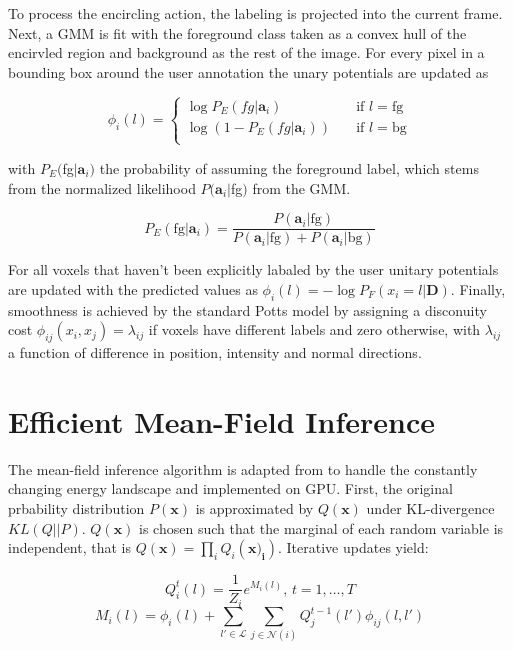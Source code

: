 \documentclass{llncs}
\begin{document}
  To process the encircling action, the labeling is projected into the current frame. Next, a GMM is fit with the foreground class taken as a convex hull of the encirvled region and background as the rest of the image. For every pixel in a bounding box around the user annotation the unary potentials are updated as 

  \begin{equation}
  \phi_i(l) =
    \begin{cases}
      \log P_E(fg|\mathbf{a}_i)       & \quad \text{if } l = \text{fg}\\
      \log (1 - P_E(fg|\mathbf{a}_i))  & \quad \text{if } l = \text{bg}\\
    \end{cases}
  \end{equation}

  with $P_E($fg$|\mathbf{a}_i)$ the probability of assuming the foreground label, which stems from the normalized likelihood $P(\mathbf{a}_i|$fg$)$ from the GMM.

  \begin{equation}
    P_E(\text{fg}|\mathbf{a}_i) = \frac{P(\mathbf{a}_i|\text{fg}) }{P(\mathbf{a}_i|\text{fg}) + P(\mathbf{a}_i|\text{bg})}
  \end{equation}

  For all voxels that haven't been explicitly labaled by the user unitary potentials are updated with the predicted values as $\phi_i(l) = -\log P_F(x_i = l | \mathbf{D})$. Finally, smoothness is achieved by the standard Potts model by assigning a disconuity cost $\phi_{ij}(x_i, x_j) = \lambda_{ij}$ if voxels have different labels and zero otherwise, with $\lambda_{ij}$ a function of difference in position, intensity and normal directions.

\section{Efficient Mean-Field Inference}

The mean-field inference algorithm is adapted from \cite{inference} to handle the constantly changing energy landscape and implemented on GPU. First, the original prbability distribution $P(\mathbf{x})$ is approximated by $Q(\mathbf{x})$ under KL-divergence $KL(Q||P)$.  $Q(\mathbf{x})$ is chosen such that the marginal of each random variable is independent, that is $Q(\mathbf{x}) = \prod_i Q_i(\mathbf{x)_i})$. Iterative updates yield:

\begin{equation}
 Q_i^t(l) = \frac{1}{Z_i}e^{M_i(l)} \text{, } t = 1, \ldots, T
\end{equation}
\begin{equation}
 M_i(l) = \phi_i(l) + \sum_{l' \in \mathcal{L}} \sum_{j \in \mathcal{N}(i)} Q_j^{t-1}(l')\phi_{ij}(l, l')
\end{equation}
\end{document}
